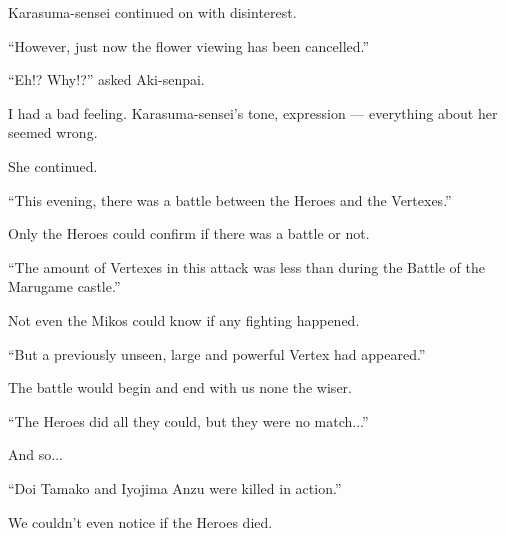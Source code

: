 Karasuma-sensei continued on with disinterest.

``However, just now the flower viewing has been cancelled.''

``Eh!? Why!?'' asked Aki-senpai.

I had a bad feeling. Karasuma-sensei's tone, expression --- everything about her seemed wrong.

She continued.

``This evening, there was a battle between the Heroes and the Vertexes.''

Only the Heroes could confirm if there was a battle or not.

``The amount of Vertexes in this attack was less than during the Battle of the Marugame castle.''

Not even the Mikos could know if any fighting happened.

``But a previously unseen, large and powerful Vertex had appeared.''

The battle would begin and end with us none the wiser.

``The Heroes did all they could, but they were no match...''

And so...

``Doi Tamako and Iyojima Anzu were killed in action.''

We couldn't even notice if the Heroes died.
